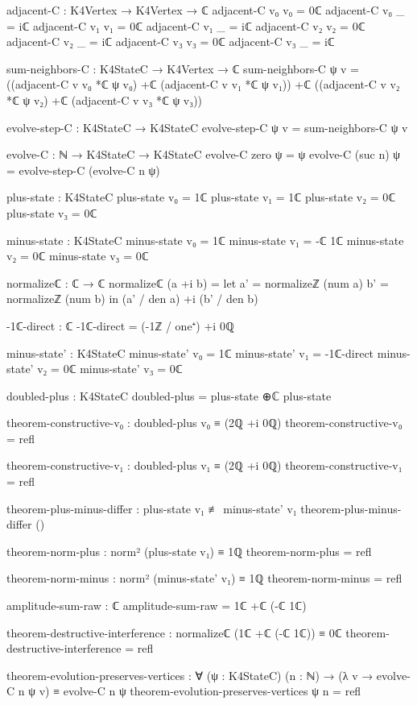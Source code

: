 \documentclass[11pt,a4paper]{book}
\begin{document}
\begin{code}
adjacent-C : K4Vertex → K4Vertex → ℂ
adjacent-C v₀ v₀ = 0ℂ
adjacent-C v₀ _  = iℂ
adjacent-C v₁ v₁ = 0ℂ
adjacent-C v₁ _  = iℂ
adjacent-C v₂ v₂ = 0ℂ
adjacent-C v₂ _  = iℂ
adjacent-C v₃ v₃ = 0ℂ
adjacent-C v₃ _  = iℂ

sum-neighbors-C : K4StateC → K4Vertex → ℂ
sum-neighbors-C ψ v = ((adjacent-C v v₀ *ℂ ψ v₀) +ℂ (adjacent-C v v₁ *ℂ ψ v₁))
                   +ℂ ((adjacent-C v v₂ *ℂ ψ v₂) +ℂ (adjacent-C v v₃ *ℂ ψ v₃))

evolve-step-C : K4StateC → K4StateC
evolve-step-C ψ v = sum-neighbors-C ψ v

evolve-C : ℕ → K4StateC → K4StateC
evolve-C zero ψ = ψ
evolve-C (suc n) ψ = evolve-step-C (evolve-C n ψ)

plus-state : K4StateC
plus-state v₀ = 1ℂ
plus-state v₁ = 1ℂ
plus-state v₂ = 0ℂ
plus-state v₃ = 0ℂ

minus-state : K4StateC
minus-state v₀ = 1ℂ
minus-state v₁ = -ℂ 1ℂ
minus-state v₂ = 0ℂ
minus-state v₃ = 0ℂ

normalizeℂ : ℂ → ℂ
normalizeℂ (a +i b) = 
  let a' = normalizeℤ (num a)
      b' = normalizeℤ (num b)
  in (a' / den a) +i (b' / den b)

-1ℂ-direct : ℂ
-1ℂ-direct = (-1ℤ / one⁺) +i 0ℚ

minus-state' : K4StateC
minus-state' v₀ = 1ℂ
minus-state' v₁ = -1ℂ-direct
minus-state' v₂ = 0ℂ
minus-state' v₃ = 0ℂ

doubled-plus : K4StateC
doubled-plus = plus-state ⊕ℂ plus-state

theorem-constructive-v₀ : doubled-plus v₀ ≡ (2ℚ +i 0ℚ)
theorem-constructive-v₀ = refl

theorem-constructive-v₁ : doubled-plus v₁ ≡ (2ℚ +i 0ℚ)
theorem-constructive-v₁ = refl

theorem-plus-minus-differ : plus-state v₁ ≢ minus-state' v₁
theorem-plus-minus-differ ()

theorem-norm-plus : norm² (plus-state v₁) ≡ 1ℚ
theorem-norm-plus = refl

theorem-norm-minus : norm² (minus-state' v₁) ≡ 1ℚ
theorem-norm-minus = refl

amplitude-sum-raw : ℂ
amplitude-sum-raw = 1ℂ +ℂ (-ℂ 1ℂ)

theorem-destructive-interference : normalizeℂ (1ℂ +ℂ (-ℂ 1ℂ)) ≡ 0ℂ
theorem-destructive-interference = refl

theorem-evolution-preserves-vertices : ∀ (ψ : K4StateC) (n : ℕ) →
  (λ v → evolve-C n ψ v) ≡ evolve-C n ψ
theorem-evolution-preserves-vertices ψ n = refl


\end{code}
\end{document}
